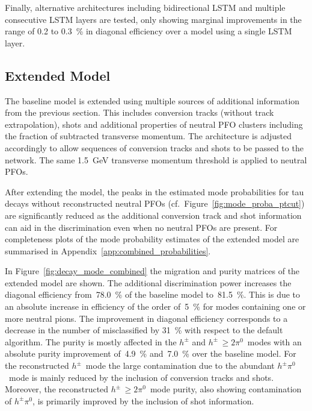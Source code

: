 Finally, alternative architectures including bidirectional LSTM and multiple
consecutive LSTM layers are tested, only showing marginal improvements in the
range of \num{0.2} to \SI{0.3}{\percent} in diagonal efficiency over a model
using a single LSTM layer.

\subsection{Extended Model}
\label{sec:extended_model}

The baseline model is extended using multiple sources of additional information
from the previous section. This includes conversion tracks (without track
extrapolation), shots and additional properties of neutral PFO clusters
including the fraction of subtracted transverse momentum. The architecture
is adjusted accordingly to allow sequences of conversion tracks and shots to be
passed to the network. The same \SI{1.5}{\GeV} transverse momentum threshold is
applied to neutral PFOs.

After extending the model, the peaks in the estimated mode probabilities for tau
decays without reconstructed neutral PFOs (cf.\
Figure~\ref{fig:mode_proba_ptcut}) are significantly reduced as the additional
conversion track and shot information can aid in the discrimination even when no
neutral PFOs are present. For completeness plots of the mode probability
estimates of the extended model are summarised in
Appendix~\ref{app:combined_probabilities}.

In Figure~\ref{fig:decay_mode_combined} the migration and purity matrices of the
extended model are shown. The additional discrimination power increases the
diagonal efficiency from~\SI{78.0}{\percent} of the baseline model
to~\SI{81.5}{\percent}. This is due to an absolute increase in efficiency of the
order of~\SI{5}{\percent} for modes containing one or more neutral pions. The
improvement in diagonal efficiency corresponds to a decrease in the number of
misclassified \tauhadvis by \SI{31}{\percent} with respect to the default
algorithm.
The purity is mostly affected in the $h^\pm$ and $h^\pm \, {\geq} 2\pi^0$~modes
with an absolute purity improvement of~\SI{4.9}{\percent} and~\SI{7.0}{\percent}
over the baseline model. For the reconstructed $h^\pm$~mode the large
contamination due to the abundant $h^\pm \pi^0$~mode is mainly reduced by the
inclusion of conversion tracks and shots.
Moreover, the reconstructed $h^\pm \, {\geq} 2\pi^0$~mode purity, also showing
contamination of $h^\pm \pi^0$, is primarily improved by the inclusion of shot
information.

